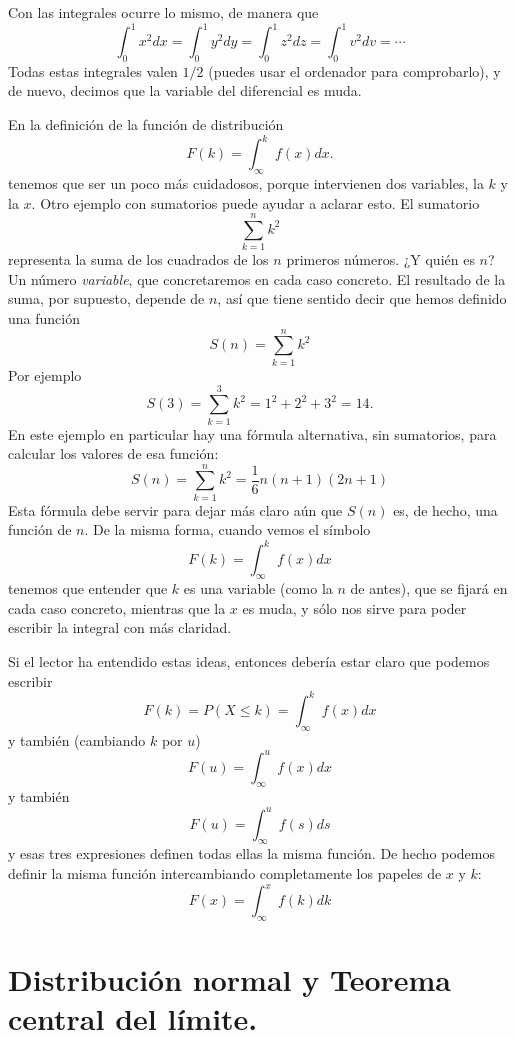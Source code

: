 Con las integrales ocurre lo mismo, de manera que
\[\int_0^1 x^2 dx = \int_0^1 y^2 dy = \int_0^1 z^2 dz = \int_0^1 v^2 dv = \cdots \]
Todas estas integrales valen $1/2$ (puedes usar el ordenador para comprobarlo), y de nuevo, decimos
que la variable del diferencial es muda.

En la definición de la función de distribución
\[F(k)=\int_{\infty}^{k} f(x)dx.\]
tenemos que ser un poco más cuidadosos, porque intervienen dos variables, la $k$ y la $x$. Otro ejemplo con sumatorios puede ayudar a aclarar esto. El sumatorio
\[\sum_{k=1}^n k^2 \]
representa la suma de los cuadrados de los $n$ primeros números. ¿Y quién es $n$? Un número {\em
variable}, que concretaremos en cada caso concreto. El resultado de la suma, por supuesto, depende
de $n$, así que tiene sentido decir que hemos definido una función
\[S(n)=\sum_{k=1}^n k^2\]
Por ejemplo
\[S(3)=\sum_{k=1}^3 k^2 = 1^2 + 2^2+ 3^2 = 14.\]
En este ejemplo en particular hay una fórmula alternativa, sin sumatorios, para calcular los
valores de esa función:
\[S(n)=\sum_{k=1}^n k^2 = \dfrac{1}{6}n(n+1)(2n+1)\]
Esta fórmula debe servir para dejar más claro aún que $S(n)$ es, de hecho, una función de $n$.  De
la misma forma, cuando vemos el símbolo
\[F(k)=\int_{\infty}^{k} f(x)dx\]
tenemos que entender que $k$ es una variable (como la $n$ de antes), que se fijará en cada caso concreto, mientras que la $x$ es muda, y sólo nos sirve para poder escribir la integral con más claridad.

Si el lector ha entendido estas ideas, entonces debería estar claro que podemos escribir
\[F(k)=P(X\leq k)=\int_{\infty}^{k} f(x)dx\]
y también (cambiando $k$ por $u$)
\[F(u)=\int_{\infty}^{u} f(x)dx\]
y también
\[F(u)=\int_{\infty}^{u} f(s)ds\]
y esas tres expresiones definen todas ellas la misma función. De hecho podemos definir la misma función intercambiando completamente los papeles de $x$ y $k$:
\[F(x)=\int_{\infty}^{x} f(k)dk\]

\section{Distribución normal y Teorema central del límite.}
\label{cap05:sec:DistribucionNormalTCL}

